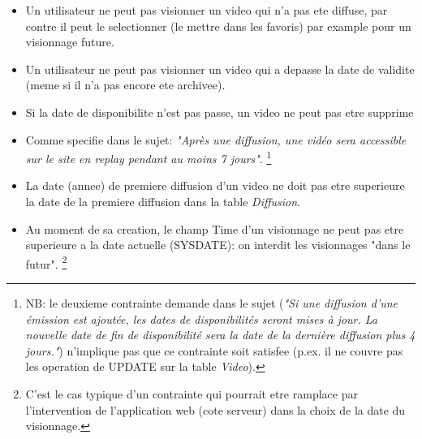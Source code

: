 \documentclass[twoside,openright,a4paper,11pt,french]{article}
\begin{document}
\begin{itemize}
\item Un utilisateur ne peut pas visionner un video qui n'a pas ete diffuse,
par contre il peut le selectionner (le mettre dans les favoris) par example
pour un visionnage future.

\item Un utilisateur ne peut pas visionner un video qui a depasse la date de validite
(meme si il n'a pas encore ete archivee).

\item Si la date de disponibilite n'est pas passe, un video ne peut pas etre supprime

\item Comme specifie dans le sujet: {\it "Après une diffusion, une vidéo sera
accessible sur le site en replay pendant au moins 7 jours"}.
\footnote{NB: le deuxieme contrainte demande dans le sujet ({\it"Si une diffusion d’une émission est
ajoutée, les dates de disponibilités seront mises à jour.  La nouvelle date de
fin de disponibilité sera la date de la dernière diffusion plus 4 jours."}) n'implique
pas que ce contrainte soit satisfee (p.ex. il ne couvre pas les operation de UPDATE 
sur la table {\it Video}).}

\item La date (annee) de premiere diffusion d'un video ne doit pas
etre superieure la date de la premiere diffusion dans la table {\it Diffusion}.

\item Au moment de sa creation, le champ Time d'un visionnage ne peut pas etre superieure
a la date actuelle (SYSDATE): on interdit les visionnages "dans le futur".
\footnote{C'est le cas typique d'un contrainte qui pourrait etre ramplace par l'intervention de
l'application web (cote serveur) dans la choix de la date du visionnage.}

\end{itemize}

\end{document}
